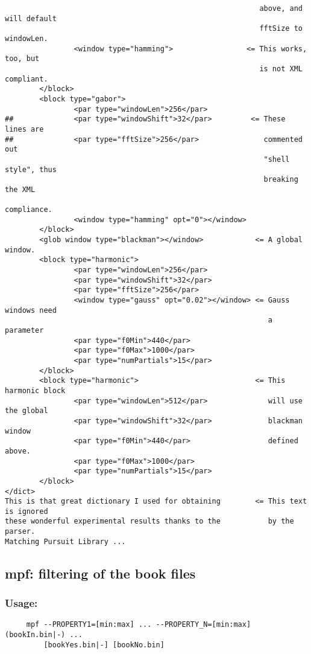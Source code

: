 \documentclass[11pt,a4paper]{article}
\begin{document}
\begin{verbatim}
                                                           above, and will default
                                                           fftSize to windowLen.
                <window type="hamming">                 <= This works, too, but
                                                           is not XML compliant.
        </block>
        <block type="gabor">
                <par type="windowLen">256</par>
##              <par type="windowShift">32</par>         <= These lines are
##              <par type="fftSize">256</par>               commented out
                                                            "shell style", thus
                                                            breaking the XML
                                                            compliance.
                <window type="hamming" opt="0"></window>
        </block>
        <glob window type="blackman"></window>            <= A global window.
        <block type="harmonic">
                <par type="windowLen">256</par>
                <par type="windowShift">32</par>
                <par type="fftSize">256</par>
                <window type="gauss" opt="0.02"></window> <= Gauss windows need
                                                             a parameter
                <par type="f0Min">440</par>
                <par type="f0Max">1000</par>
                <par type="numPartials">15</par>
        </block>
        <block type="harmonic">                           <= This harmonic block
                <par type="windowLen">512</par>              will use the global
                <par type="windowShift">32</par>             blackman window
                <par type="f0Min">440</par>                  defined above.
                <par type="f0Max">1000</par>
                <par type="numPartials">15</par>
        </block>
</dict>
This is that great dictionary I used for obtaining        <= This text is ignored
these wonderful experimental results thanks to the           by the parser.
Matching Pursuit Library ...
\end{verbatim}


\clearpage
\subsection{mpf: filtering of the book files}

\subsubsection*{Usage:}
\begin{verbatim}
     mpf --PROPERTY1=[min:max] ... --PROPERTY_N=[min:max] (bookIn.bin|-) ...
         [bookYes.bin|-] [bookNo.bin]
\end{verbatim}
\end{document}
